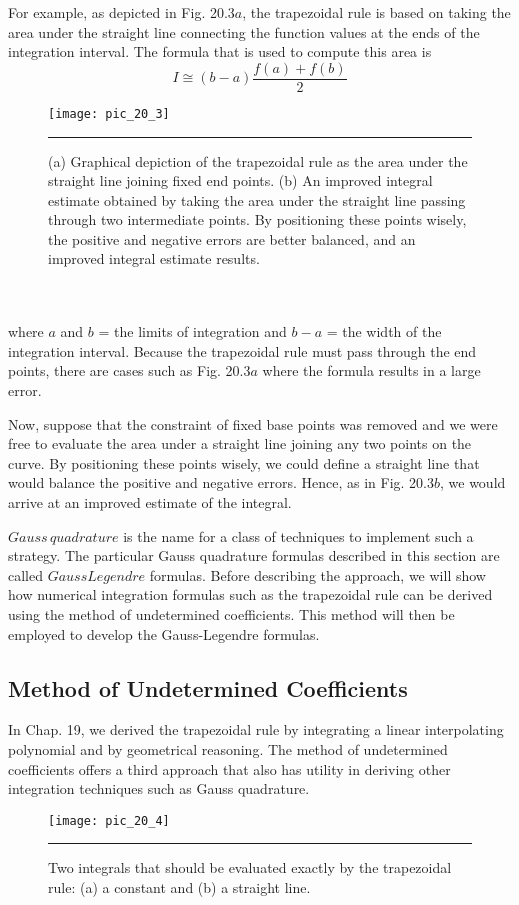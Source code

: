 \documentclass[../main.tex]{subfiles}
\begin{document}
For example, as depicted in Fig. 20.3$a$, the trapezoidal rule is based on taking the area
under the straight line connecting the function values at the ends of the integration interval.
The formula that is used to compute this area is
\begin{equation}
	\tag{20.10}
	I\cong (b-a)\dfrac{f(a)+f(b)}{2}
\end{equation}
\pagebreak
\begin{figure}[hbt!]
	\centering
	\texttt{[image: pic\_20\_3]}
	\caption{\textsf{(a) Graphical depiction of the trapezoidal rule as the area under the straight line joining fixed
end points. (b) An improved integral estimate obtained by taking the area under the straight line
passing through two intermediate points. By positioning these points wisely, the positive and 
negative errors are better balanced, and an improved integral estimate results.}} \hrule
	\label{pic.20.3}
\end{figure}\\
\vspace{0.1in}\\
where $a$ and $b$ = the limits of integration and $b − a$ = the width of the integration interval.
Because the trapezoidal rule must pass through the end points, there are cases such as
Fig. 20.3$a$ where the formula results in a large error.

Now, suppose that the constraint of fixed base points was removed and we were free to
evaluate the area under a straight line joining any two points on the curve. By positioning
these points wisely, we could define a straight line that would balance the positive and negative errors. Hence, as in Fig. 20.3$b$, we would arrive at an improved estimate of the integral.

$Gauss\, quadrature$ is the name for a class of techniques to implement such a strategy.
The particular Gauss quadrature formulas described in this section are called $GaussLegendre$ formulas. Before describing the approach, we will show how numerical integration formulas such as the trapezoidal rule can be derived using the method of undetermined
coefficients. This method will then be employed to develop the Gauss-Legendre formulas.


\subsection{Method of Undetermined Coefficients}
In Chap. 19, we derived the trapezoidal rule by integrating a linear interpolating polynomial
and by geometrical reasoning. The method of undetermined coefficients offers a third approach that also has utility in deriving other integration techniques such as Gauss quadrature.\\
\begin{figure}[hbt!]
	\centering
	\texttt{[image: pic\_20\_4]}
	\caption{\textsf{Two integrals that should be evaluated exactly by the trapezoidal rule: (a) a constant and 
(b) a straight line.}} \hrule
	\label{pic.20.4}
\end{figure}
\end{document}
